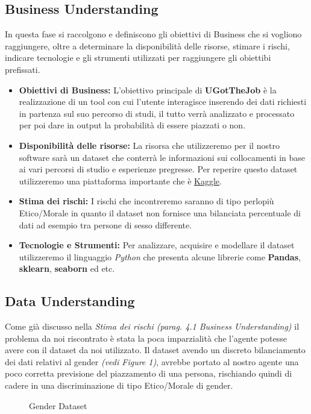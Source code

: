 \documentclass[12pt]{article}
\newcommand{\mainname}{UGotTheJob}
\begin{document}
\newpage

\subsection{Business Understanding}
In questa fase si raccolgono e definiscono gli obiettivi di Business che si vogliono raggiungere, oltre a determinare
la disponibilità delle risorse, stimare i rischi, indicare tecnologie e gli strumenti utilizzati per raggiungere gli obiettibi
prefissati.

\begin{itemize}
    \item \textbf{Obiettivi di Business:} L'obiettivo principale di \textbf{\mainname} è la realizzazione di un tool con cui l'utente interagisce inserendo
          dei dati richiesti in partenza sul suo percorso di studi, il tutto verrà analizzato e processato per poi dare in
          output la probabilità di essere piazzati o non.

    \item \textbf{Disponibilità delle risorse:} La risorsa che utilizzeremo per il nostro software sarà un dataset che conterrà
          le informazioni sui collocamenti in base ai vari percorsi di studio e esperienze pregresse. Per reperire questo dataset utilizzeremo una piattaforma importante che è \href{https://www.kaggle.com/}{Kaggle}.

    \item \textbf{Stima dei rischi:} I rischi che incontreremo saranno di tipo perlopiù Etico/Morale in quanto il dataset non fornisce una bilanciata percentuale di dati ad esempio tra persone di
          sesso differente.

    \item \textbf{Tecnologie e Strumenti:} Per analizzare, acquisire e modellare il dataset utilizzeremo il linguaggio \textit{Python} che presenta alcune librerie come \textbf{Pandas}, \textbf{sklearn}, \textbf{seaborn} ed etc.

\end{itemize}

\subsection{Data Understanding}
Come già discusso nella \textit{Stima dei rischi (parag. 4.1 Business Understanding)} il problema da noi riscontrato è stata la poca imparzialità che l'agente potesse avere
con il dataset da noi utilizzato. Il dataset avendo un discreto bilanciamento dei dati relativi al gender \textit{(vedi Figure 1)}, avrebbe portato al nostro agente una poco
corretta previsione del piazzamento di una persona, rischiando quindi di cadere in una discriminazione di tipo Etico/Morale di gender.
\begin{figure}[ht]
    \centering
    \caption{Gender Dataset}
    \label{fig:torta}
\end{figure}
\end{document}
